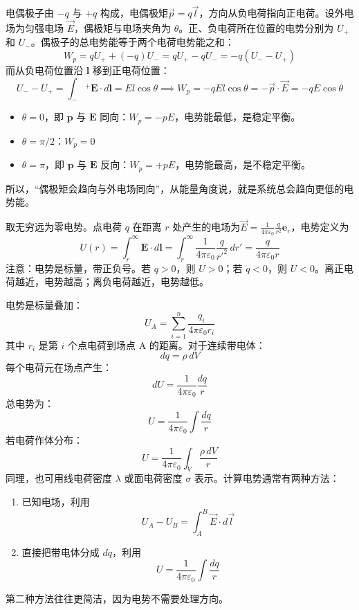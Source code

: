 \documentclass[lang=cn,11pt]{elegantbook}
\begin{document}
\begin{conclusion}[电偶极子在匀强电场中的电势能]
电偶极子由 \(-q\) 与 \(+q\) 构成，电偶极矩\(\vec{p}=q\vec{l}\)，方向从负电荷指向正电荷。设外电场为匀强电场 \(\vec{E}\)，偶极矩与电场夹角为 \(\theta\)。正、负电荷所在位置的电势分别为 \(U_+\) 和 \(U_-\)。偶极子的总电势能等于两个电荷电势能之和：
\[W_p=qU_++(-q)U_-=qU_+-qU_-=-q(U_--U_+)\]
而从负电荷位置沿 \(\mathbf l\) 移到正电荷位置：
\[U_--U_+=\int_-\!^+\mathbf E\cdot d\mathbf l=El\cos\theta\implies W_p=-qEl\cos\theta=-\vec{p}\cdot\vec{E}=-qE\cos\theta\]
\begin{itemize}
\item \(\theta=0\)，即 \(\mathbf p\) 与 \(\mathbf E\) 同向：\(W_p=-pE\)，电势能最低，是稳定平衡。
\item \(\theta=\pi/2\)：\(W_p=0\)
\item \(\theta=\pi\)，即 \(\mathbf p\) 与 \(\mathbf E\) 反向：\(W_p=+pE\)，电势能最高，是不稳定平衡。
\end{itemize}
所以，“偶极矩会趋向与外电场同向”，从能量角度说，就是系统总会趋向更低的电势能。
\end{conclusion}

\begin{definition}[点电荷的电势]
  取无穷远为零电势。点电荷 \(q\) 在距离 \(r\) 处产生的电场为\(\vec{E}=\frac{1}{4\pi\varepsilon_0}\frac{q}{r^2}\mathbf e_r\)，电势定义为\[U(r)=\int_r^\infty\mathbf E\cdot d\mathbf l=\int_r^\infty\frac{1}{4\pi\varepsilon_0}\frac{q}{r'^2}\,dr'=
\boxed{\frac{q}{4\pi\varepsilon_0r}}\]注意：电势是标量，带正负号。若 \(q>0\)，则 \(U>0\)；若 \(q<0\)，则 \(U<0\)。离正电荷越近，电势越高；离负电荷越近，电势越低。
\end{definition}

\begin{theorem}[电势的叠加原理]
电势是标量叠加：
\[
\boxed{
U_A=
\sum_{i=1}^n
\frac{q_i}{4\pi\varepsilon_0r_i}
}
\]其中 \(r_i\) 是第 \(i\) 个点电荷到场点 A 的距离。对于连续带电体：
\[
dq=\rho\,dV
\]每个电荷元在场点产生：
\[
dU=
\frac{1}{4\pi\varepsilon_0}
\frac{dq}{r}
\]总电势为：
\[
\boxed{
U=
\frac{1}{4\pi\varepsilon_0}
\int\frac{dq}{r}
}
\]若电荷作体分布：
\[
U=
\frac{1}{4\pi\varepsilon_0}
\int_V\frac{\rho\,dV}{r}
\]同理，也可用线电荷密度 \(\lambda\) 或面电荷密度 \(\sigma\) 表示。计算电势通常有两种方法：
\begin{enumerate}
  \item 已知电场，利用
\[
U_A-U_B=\int_A^B\vec{E}\cdot d\vec{l}
\]
\item 直接把带电体分成 \(dq\)，利用
\[
U=\frac{1}{4\pi\varepsilon_0}\int\frac{dq}{r}
\]
\end{enumerate}第二种方法往往更简洁，因为电势不需要处理方向。
\end{theorem}
\end{document}
